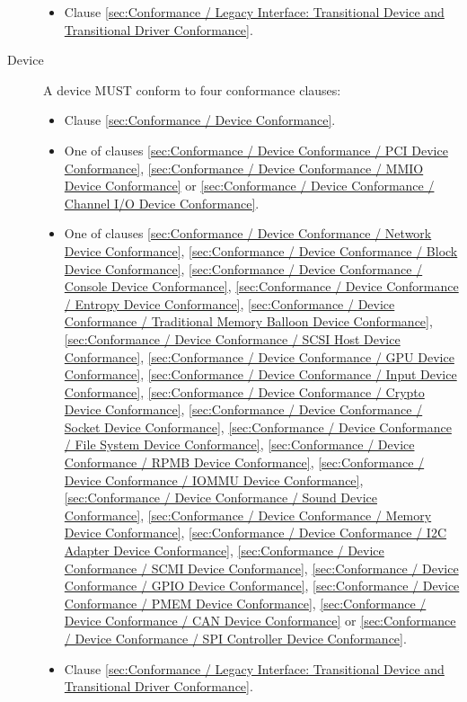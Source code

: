 \begin{description}
\begin{itemize}
    \item Clause \ref{sec:Conformance / Legacy Interface: Transitional Device and Transitional Driver Conformance}.
  \end{itemize}
\item[Device] A device MUST conform to four conformance clauses:
  \begin{itemize}
    \item Clause \ref{sec:Conformance / Device Conformance}.
    \item One of clauses \ref{sec:Conformance / Device Conformance / PCI Device Conformance}, \ref{sec:Conformance / Device Conformance / MMIO Device Conformance} or \ref{sec:Conformance / Device Conformance / Channel I/O Device Conformance}.
    \item One of clauses 
\ref{sec:Conformance / Device Conformance / Network Device Conformance}, 
\ref{sec:Conformance / Device Conformance / Block Device Conformance}, 
\ref{sec:Conformance / Device Conformance / Console Device Conformance}, 
\ref{sec:Conformance / Device Conformance / Entropy Device Conformance}, 
\ref{sec:Conformance / Device Conformance / Traditional Memory Balloon Device Conformance}, 
\ref{sec:Conformance / Device Conformance / SCSI Host Device Conformance}, 
\ref{sec:Conformance / Device Conformance / GPU Device Conformance},
\ref{sec:Conformance / Device Conformance / Input Device Conformance}, 
\ref{sec:Conformance / Device Conformance / Crypto Device Conformance}, 
\ref{sec:Conformance / Device Conformance / Socket Device Conformance}, 
\ref{sec:Conformance / Device Conformance / File System Device Conformance},
\ref{sec:Conformance / Device Conformance / RPMB Device Conformance},
\ref{sec:Conformance / Device Conformance / IOMMU Device Conformance},
\ref{sec:Conformance / Device Conformance / Sound Device Conformance},
\ref{sec:Conformance / Device Conformance / Memory Device Conformance},
\ref{sec:Conformance / Device Conformance / I2C Adapter Device Conformance},
\ref{sec:Conformance / Device Conformance / SCMI Device Conformance},
\ref{sec:Conformance / Device Conformance / GPIO Device Conformance},
\ref{sec:Conformance / Device Conformance / PMEM Device Conformance},
\ref{sec:Conformance / Device Conformance / CAN Device Conformance} or
\ref{sec:Conformance / Device Conformance / SPI Controller Device Conformance}.

    \item Clause \ref{sec:Conformance / Legacy Interface: Transitional Device and Transitional Driver Conformance}.
  \end{itemize}
\end{description}

